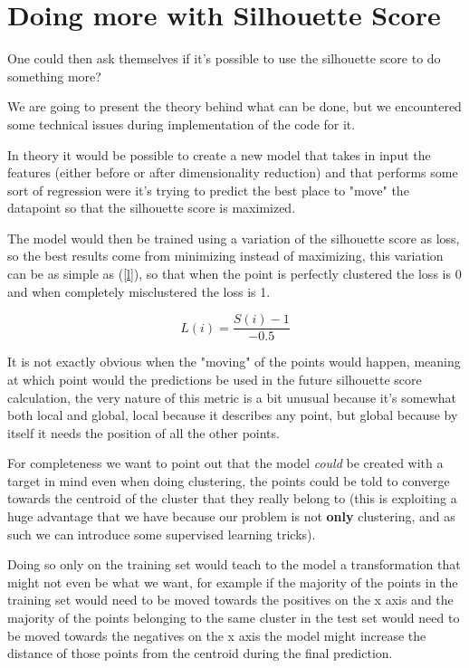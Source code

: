 \documentclass[conference]{IEEEtran}
\begin{document}
\section{Doing more with Silhouette Score}
One could then ask themselves if it's possible to use the silhouette score to do something more?

We are going to present the theory behind what can be done, but we encountered some technical issues during implementation of the code for it.

In theory it would be possible to create a new model that takes in input the features (either before or after dimensionality reduction) and that performs some sort of regression were it's trying to predict the best place to "move" the datapoint so that the silhouette score is maximized.

The model would then be trained using a variation of the silhouette score as loss, so the best results come from minimizing instead of maximizing, this variation can be as simple as (\ref{l}), so that when the point is perfectly clustered the loss is 0 and when completely misclustered the loss is 1.

\begin{equation}
L(i) = \frac{S(i) - 1}{-0.5}
\label{l}
\end{equation}

It is not exactly obvious when the "moving" of the points would happen, meaning at which point would the predictions be used in the future silhouette score calculation, the very nature of this metric is a bit unusual because it's somewhat both local and global, local because it describes any point, but global because by itself it needs the position of all the other points.

For completeness we want to point out that the model \emph{could} be created with a target in mind even when doing clustering, the points could be told to converge towards the centroid of the cluster that they really belong to (this is exploiting a huge advantage that we have because our problem is not \textbf{only} clustering, and as such we can introduce some supervised learning tricks).

Doing so only on the training set would teach to the model a transformation that might not even be what we want, for example if the majority of the points in the training set would need to be moved towards the positives on the x axis and the majority of the points belonging to the same cluster in the test set would need to be moved towards the negatives on the x axis the model might increase the distance of those points from the centroid during the final prediction.
\end{document}

